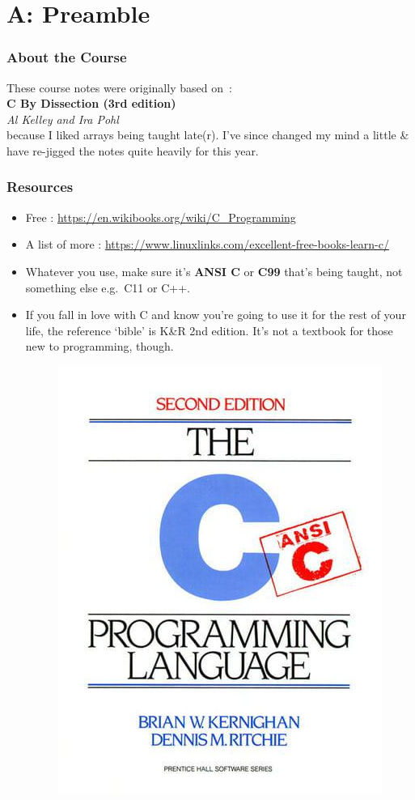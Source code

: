 \section{A: Preamble}

\begin{frame}%
\frametitle{About the Course}
%
These course notes were originally based on~:\\[1em]
{\bf C By Dissection (3rd edition)}\\
{\it Al Kelley and Ira Pohl}\\[1em]

because I liked arrays being taught late(r).
I've since changed my mind a little \& have re-jigged the notes quite heavily for this year.
\end{frame}

\begin{frame}%
\frametitle{Resources}
\begin{itemize}[<+->]
\item Free : \url{https://en.wikibooks.org/wiki/C_Programming}
\item A list of more : \url{https://www.linuxlinks.com/excellent-free-books-learn-c/}
\item Whatever you use, make sure it's {\bf ANSI C} or {\bf C99} that's being taught, not something else e.g.\ C11 or C++.
\item If you fall in love with C and  know you're going to use it for the rest of your life, the reference `bible' is K\&R 2nd edition.
It's not a textbook for those new to programming, though.
\begin{figure}[h]
\centerline{
\includegraphics[scale=0.25]{../Figs/9780131103627.jpg}
}
\end{figure}
\end{itemize}
\end{frame}

